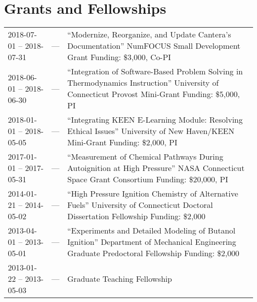 \section{{\sectionfont Grants and Fellowships}}
\vspace{-0.32in}
\begin{center}
\begin{longtable}{lcl}
2018-07-01 -- 2018-07-31 & --- & \makecell{``Modernize, Reorganize, and Update Cantera's \\
Documentation'' \\ NumFOCUS Small Development Grant \\ Funding: \$3,000, Co-PI} \\
2018-06-01 -- 2018-06-30 & --- & \makecell{``Integration of Software-Based Problem Solving in \\
Thermodynamics Instruction'' \\ University of Connecticut Provost Mini-Grant \\ Funding: \$5,000, PI} \\
2018-01-01 -- 2018-05-05 & --- & \makecell{``Integrating KEEN E-Learning Module: Resolving\\
Ethical Issues'' \\ University of New Haven/KEEN Mini-Grant \\ Funding: \$2,000, PI} \\
2017-01-01 -- 2017-05-31 & --- & \makecell{``Measurement of Chemical Pathways During\\Autoignition at High Pressure'' \\ NASA Connecticut Space Grant Consortium \\ Funding: \$20,000, PI} \\
2014-01-21 -- 2014-05-02 & --- & \makecell{``High Pressure Ignition Chemistry of Alternative\\Fuels'' \\
University of Connecticut Doctoral Dissertation\\Fellowship \\
Funding: \$2,000} \\
2013-04-01 -- 2013-05-01 & --- & \makecell{``Experiments and Detailed Modeling of Butanol\\Ignition'' \\
Department of Mechanical Engineering Graduate\\Predoctoral Fellowship \\
Funding: \$2,000} \\
2013-01-22 -- 2013-05-03 & --- & \makecell{Graduate Teaching Fellowship \\
}
\end{longtable}
\end{center}
